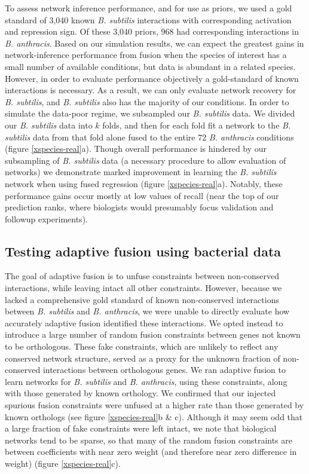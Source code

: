 \documentclass[11pt]{article}
\begin{document}
To assess network inference performance, and for use as priors, we used a gold standard of 3,040 known \textit{B. subtilis} interactions with corresponding activation and repression sign. 
Of these 3,040 priors, 968 had corresponding interactions in \textit{B. anthracis}. 
Based on our simulation results, we can expect the greatest gains in network-inference performance from fusion when the species of interest has a small number of available conditions, but data is abundant in a related species. 
However, in order to evaluate performance objectively a gold-standard of known interactions is necessary. 
As a result, we can only evaluate network recovery for \textit{B. subtilis}, and \textit{B. subtilis} also has the majority of our conditions. 
In order to simulate the data-poor regime, we subsampled our \textit{B. subtilis} data. 
We divided our \textit{B. subtilis} data into $k$ folds, and then for each fold fit a network to the \textit{B. subtilis} data from that fold alone fused to the entire 72 \textit{B. anthracis} conditions (figure \ref{xspecies-real}a). 
Though overall performance is hindered by our subsampling of \textit{B. subtilis} data (a necessary procedure to allow evaluation of networks) we demonstrate marked improvement in learning the \textit{B. subtilis} network when using fused regression (figure \ref{xspecies-real}a). 
Notably, these performance gains occur mostly at low values of recall (near the top of our prediction ranks, where biologists would presumably focus validation and followup experiments). 

\subsection{Testing adaptive fusion using bacterial data}
 The goal of adaptive fusion is to unfuse constraints between non-conserved interactions, while leaving intact all other constraints. 
 However, because we lacked a comprehensive gold standard of known non-conserved interactions between \textit{B. subtilis} and \textit{B. anthracis}, we were unable to directly evaluate how accurately adaptive fusion identified these interactions.
  We opted instead to introduce a large number of random fusion constraints between genes not known to be orthologous. 
 These fake constraints, which are unlikely to reflect any conserved network structure, served as a proxy for the unknown fraction of non-conserved interactions between orthologous genes. 
 We ran adaptive fusion to learn networks for \textit{B. subtilis} and \textit{B. anthracis}, using these constraints, along with those generated by known orthology. 
 We confirmed that our injected spurious fusion constraints were unfused at a higher rate than those generated by known orthologs (see figure \ref{xspecies-real}b & c). 
 Although it may seem odd that a large fraction of fake constraints were left intact, we note that biological networks tend to be sparse, so that many of the random fusion constraints are between coefficients with near zero weight (and therefore near zero difference in weight) (figure \ref{xspecies-real}c). 
\end{document}
